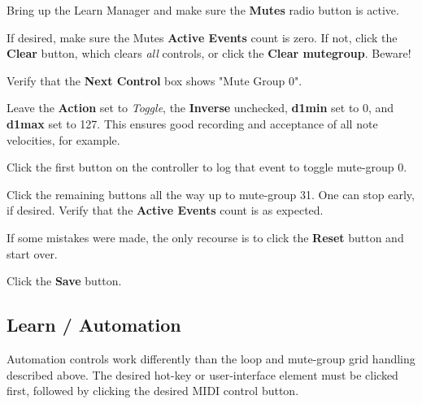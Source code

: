    \begin{enumber}
      \item Bring up the Learn Manager and make sure the \textbf{Mutes}
         radio button is active.
      \item If desired,
         make sure the Mutes \textbf{Active Events} count is zero.
         If not, click the \textbf{Clear} button, which clears
         \textsl{all} controls, or click the \textbf{Clear mutegroup}.
         Beware!
      \item Verify that the \textbf{Next Control} box shows
         "Mute Group 0".
      \item Leave the \textbf{Action} set to \textsl{Toggle},
         the \textbf{Inverse} unchecked, \textbf{d1min} set to 0,
         and \textbf{d1max} set to 127.
         This ensures good recording and acceptance of all note velocities,
         for example.
      \item Click the first button on the controller to log that event
         to toggle mute-group 0.
      \item Click the remaining buttons all the way up to mute-group 31.
         One can stop early, if desired.
         Verify that the \textbf{Active Events} count is
         as expected.
      \item If some mistakes were made, the only recourse is to
         click the \textbf{Reset} button and start over.
      \item Click the \textbf{Save} button.
   \end{enumber}

\subsection{Learn / Automation}
\label{subsec:midi_learn_automation}

   Automation controls work differently than the loop and mute-group grid
   handling described above.
   The desired hot-key or user-interface element must be clicked first,
   followed by clicking the desired MIDI control button.

